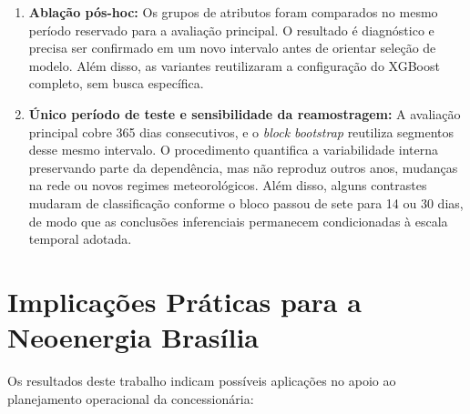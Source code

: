 \begin{enumerate}
    \item \textbf{Ablação pós-hoc:} Os grupos de atributos foram comparados no mesmo período reservado para a avaliação principal. O resultado é diagnóstico e precisa ser confirmado em um novo intervalo antes de orientar seleção de modelo. Além disso, as variantes reutilizaram a configuração do XGBoost completo, sem busca específica.

    \item \textbf{Único período de teste e sensibilidade da reamostragem:} A avaliação principal cobre 365 dias consecutivos, e o \textit{block bootstrap} reutiliza segmentos desse mesmo intervalo. O procedimento quantifica a variabilidade interna preservando parte da dependência, mas não reproduz outros anos, mudanças na rede ou novos regimes meteorológicos. Além disso, alguns contrastes mudaram de classificação conforme o bloco passou de sete para 14 ou 30 dias, de modo que as conclusões inferenciais permanecem condicionadas à escala temporal adotada.
\end{enumerate}

\section{Implicações Práticas para a Neoenergia Brasília}

Os resultados deste trabalho indicam possíveis aplicações no apoio ao planejamento operacional da concessionária:

